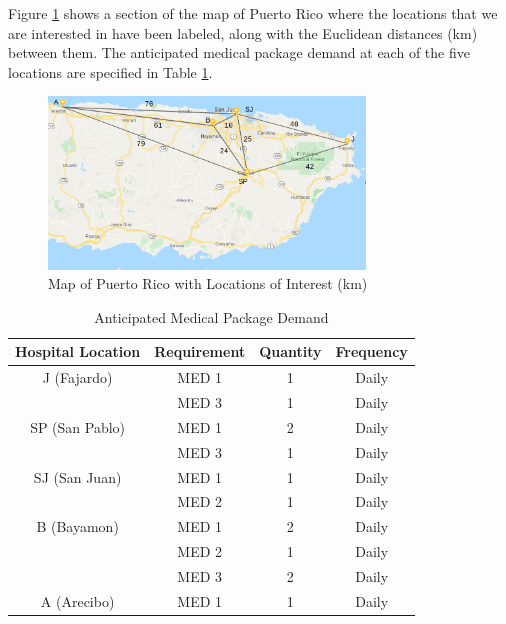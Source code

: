 Figure \ref{fig:labeled_map} shows a section of the map of Puerto Rico where the locations that we are interested in have been labeled, along with the Euclidean distances (km) between them. The anticipated medical package demand at each of the five locations are specified in Table \ref{tab:package_demand}.

\begin{figure}[h]
    \centering
    \includegraphics[width=0.75\textwidth]{map.png}
    \caption{Map of Puerto Rico with Locations of Interest (km)}
    \label{fig:labeled_map}
\end{figure}

\begin{table}[h]
    \centering
    \begin{tabular}{c|c|c|c}
    \hline Hospital Location & Requirement & Quantity & Frequency \\
    \hline J (Fajardo) & MED 1 & 1 & Daily  \\
             & MED 3 & 1 & Daily \\
    \hline SP (San Pablo) & MED 1 & 2 & Daily \\
              & MED 3 & 1 & Daily \\
    \hline SJ (San Juan) & MED 1 & 1 & Daily \\
              & MED 2 & 1 & Daily \\
    \hline B (Bayamon) & MED 1 & 2 & Daily \\
             & MED 2 & 1 & Daily \\
             & MED 3 & 2 & Daily \\
    \hline A (Arecibo) & MED 1 & 1 & Daily
    \end{tabular}
    \caption{Anticipated Medical Package Demand}
    \label{tab:package_demand}
\end{table}

